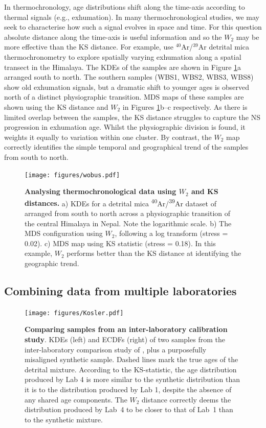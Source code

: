\documentclass[gchron, manuscript]{article}
\begin{document}
In thermochronology, age distributions shift along the time-axis according to thermal signals (e.g., exhumation). In many thermochronological studies, we may seek to characterise how such a signal evolves in space and time. For this question absolute distance along the time-axis is useful information and so the $W_2$ may be more effective than the KS distance. For example, \citet{wobus_has_2003} use $^{40}$Ar/$^{39}$Ar detrital mica thermochronometry to explore spatially varying exhumation along a spatial transect in the Himalaya. The KDEs of the samples are shown in Figure \ref{fig:Wobus}a arranged south to north. The southern samples (WBS1, WBS2, WBS3, WBS8) show old exhumation signals, but a dramatic shift to younger ages is observed north of a distinct physiographic transition. MDS maps of these samples are shown using the KS distance and $W_2$ in Figures \ref{fig:Wobus}b--c respectively. As there is limited overlap between the samples, the KS distance struggles to capture the NS progression in exhumation age. Whilst the physiographic division is found, it weights it equally to variation within one cluster. By contrast, the $W_2$ map correctly identifies the simple temporal and geographical trend of the samples from south to north. 

\begin{figure}
    \centering
    \texttt{[image: figures/wobus.pdf]}
    \caption{\textbf{Analysing thermochronological data using $W_2$ and KS distances.} a) KDEs for a detrital mica \textsuperscript{40}Ar/\textsuperscript{39}Ar dataset of \citet{wobus_has_2003} arranged from south to north across a physiographic transition of the central Himalaya in Nepal. Note the logarithmic scale. b) The MDS configuration using $W_2$, following a log transform (stress = 0.02). c) MDS map using KS statistic (stress = 0.18). In this example, $W_2$ performs better than the KS distance at identifying the geographic trend.}
    \label{fig:Wobus}
\end{figure}

\subsection{Combining data from multiple laboratories}

\begin{figure}
    \centering
    \texttt{[image: figures/Kosler.pdf]}
    \caption{\textbf{Comparing samples from an inter-laboratory calibration study}. KDEs (left) and ECDFs (right) of two samples from the inter-laboratory comparison study of \citep{kosler_u-pb_2013}, plus a purposefully misaligned synthetic sample. Dashed lines mark the true ages of the detrital mixture. According to the KS-statistic, the age distribution produced by Lab 4 is more similar to the synthetic distribution than it is to the distribution produced by Lab 1, despite the absence of any shared age components. The $W_2$ distance correctly deems the distribution produced by Lab~4 to be closer to that of Lab~1 than to the synthetic mixture.}
    \label{fig:interlab}
\end{figure}
\end{document}
